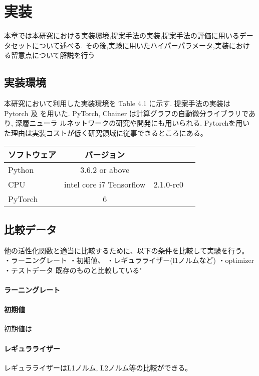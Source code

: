\chapter{実装}
\label{implementation}

本章では本研究における実装環境,提案手法の実装,提案手法の評価に用いるデータセットについて述べる.
その後,実験に用いたハイパーパラメータ,実装における留意点について解説を行う

\section{実装環境}



本研究において利用した実装環境を Table 4.1 に示す. 提案手法の実装は Pytorch 及
を用いた.  PyTorch, Chainer は計算グラフの自動微分ライブラリであり, 深層ニューラ
ルネットワークの研究や開発にも用いられる.
Pytorchを用いた理由は実装コストが低く研究領域に従事できるところにある。



\begin{tabular}{l*{2}{c}r}
ソフトウェア              & バージョン \\
\hline
Python            & 3.6.2 or above \\
CPU               & intel core i7
Tensorflow        & 2.1.0-rc0 \\
PyTorch           & 6 \\
\end{tabular}





\section{比較データ}

他の活性化関数と適当に比較するために、以下の条件を比較して実験を行う。
・ラーニングレート
・初期値、
・レギュラライザー(l1ノルムなど)
・optimizer
・テストデータ
既存のものと比較している"
\subsubsection{ラーニングレート}

\subsubsection{初期値}
初期値は
\subsubsection{レギュラライザー}
レギュラライザーはL1ノルム, L2ノルム等の比較ができる。
